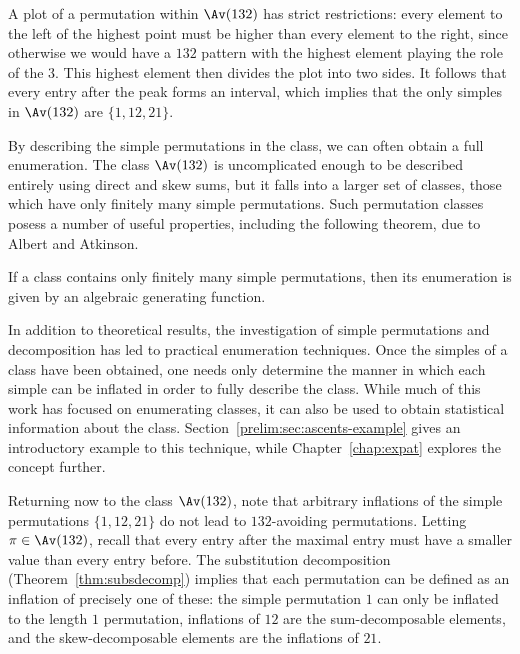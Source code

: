 \documentclass[12pt,twoside]{memoir}
\begin{document}
      A plot of a permutation within $\Av (132)$ has strict restrictions: every
      element to the left of the highest point must be higher than every element
      to the right, since otherwise we would have a $132$ pattern with the
      highest element playing the role of the 3. This highest element then
      divides the plot into two sides. It follows that every entry after the
      peak forms an interval, which implies that the only simples in $\Av (132)$
      are $\{1, 12, 21\}$. 


      By describing the simple permutations in the class, we can often obtain a
      full enumeration. The class $\Av (132)$ is uncomplicated enough to be
      described entirely using direct and skew sums, but it falls into a larger
      set of classes, those which have only finitely many simple permutations.
      Such permutation classes posess a number of useful properties, including
      the following theorem, due to Albert and Atkinson. 

      \begin{theorem}
        If a class contains only finitely many simple permutations, then its
        enumeration is given by an algebraic generating function. 
      \end{theorem}

      In addition to theoretical results, the investigation of simple
      permutations and decomposition has led to practical enumeration techniques.
      Once the simples of a class have been obtained, one needs only determine
      the manner in which each simple can be inflated in order to fully describe
      the class. While much of this work has focused on enumerating classes, it
      can also be used to obtain statistical information about the class.
      Section~\ref{prelim:sec:ascents-example} gives an introductory example to
      this technique, while Chapter~\ref{chap:expat} explores the concept
      further. 

      Returning now to the class $\Av(132)$, note that arbitrary inflations of
      the simple permutations $\{1, 12, 21\}$ do not lead to $132$-avoiding
      permutations. Letting $\pi \in \Av(132)$, recall that every entry after the
      maximal entry must have a smaller value than every entry before. The
      substitution decomposition (Theorem~\ref{thm:subsdecomp}) implies that 
      each permutation can be defined as an inflation of precisely one of these:
      the simple permutation $1$ can only be inflated to the length $1$
      permutation, inflations of
      $12$ are the sum-decomposable elements, and the skew-decomposable elements
      are the inflations of $21$. 
      
\end{document}
